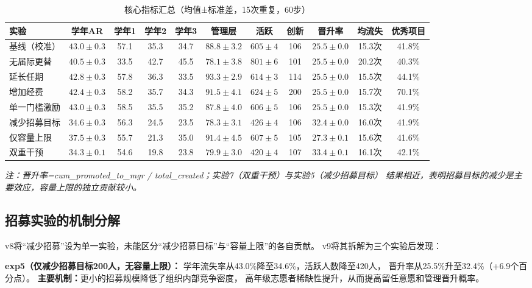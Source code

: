 \documentclass[12pt,a4paper]{article}
\begin{document}
\begin{table}[htbp]
\caption{核心指标汇总（均值±标准差，15次重复，60步）}
\centering
\scriptsize
\begin{tabular}{lcccccccccc}
\toprule
\textbf{实验} & \textbf{学年AR} & \textbf{学年1} & \textbf{学年2} & \textbf{学年3} & \textbf{管理层} & \textbf{活跃} & \textbf{创新} & \textbf{晋升率} & \textbf{均流失} & \textbf{优秀项目} \\
\midrule
基线（校准） & $43.0\pm0.3$ & 57.1 & 35.3 & 34.7 & $88.8\pm3.2$ & $605\pm4$ & 106 & $25.5\pm0.0$ & 15.3次 & 41.8\% \\
无届际更替 & $40.5\pm0.3$ & 33.5 & 42.7 & 45.5 & $78.1\pm3.8$ & $801\pm6$ & 101 & $25.5\pm0.0$ & 20.2次 & 40.3\% \\
延长任期 & $42.8\pm0.3$ & 57.8 & 36.3 & 33.5 & $93.3\pm2.9$ & $614\pm3$ & 114 & $25.5\pm0.0$ & 15.5次 & 44.1\% \\
增加经费 & $42.4\pm0.3$ & 58.2 & 35.7 & 34.3 & $91.5\pm4.1$ & $624\pm5$ & 200 & $25.5\pm0.0$ & 15.7次 & 70.1\% \\
单一门槛激励 & $43.0\pm0.3$ & 58.5 & 35.5 & 35.2 & $87.8\pm4.0$ & $606\pm5$ & 106 & $25.5\pm0.0$ & 15.3次 & 41.9\% \\
减少招募目标 & $34.6\pm0.3$ & 56.3 & 24.5 & 23.5 & $78.3\pm3.1$ & $426\pm4$ & 106 & $32.4\pm0.0$ & 16.0次 & 41.9\% \\
仅容量上限 & $37.5\pm0.3$ & 55.7 & 21.3 & 35.0 & $91.4\pm4.5$ & $607\pm5$ & 105 & $27.3\pm0.1$ & 15.6次 & 41.6\% \\
双重干预 & $34.3\pm0.1$ & 54.6 & 19.8 & 23.8 & $79.9\pm3.0$ & $420\pm4$ & 107 & $33.4\pm0.1$ & 16.1次 & 42.1\% \\
\bottomrule
\end{tabular}
\end{table}
\textit{注：晋升率=cum\_promoted\_to\_mgr / total\_created；实验7（双重干预）与实验5（减少招募目标）
结果相近，表明招募目标的减少是主要效应，容量上限的独立贡献较小。}

\subsection{招募实验的机制分解}

v8将“减少招募”设为单一实验，未能区分“减少招募目标”与“容量上限”的各自贡献。
v9将其拆解为三个实验后发现：

\textbf{exp5（仅减少招募目标200人，无容量上限）：}
学年流失率从43.0\%降至34.6\%，活跃人数降至420人，
晋升率从25.5\%升至32.4\%（+6.9个百分点）。
\textbf{主要机制：}更小的招募规模降低了组织内部竞争密度，
高年级志愿者稀缺性提升，从而提高留任意愿和管理晋升概率。
\end{document}
